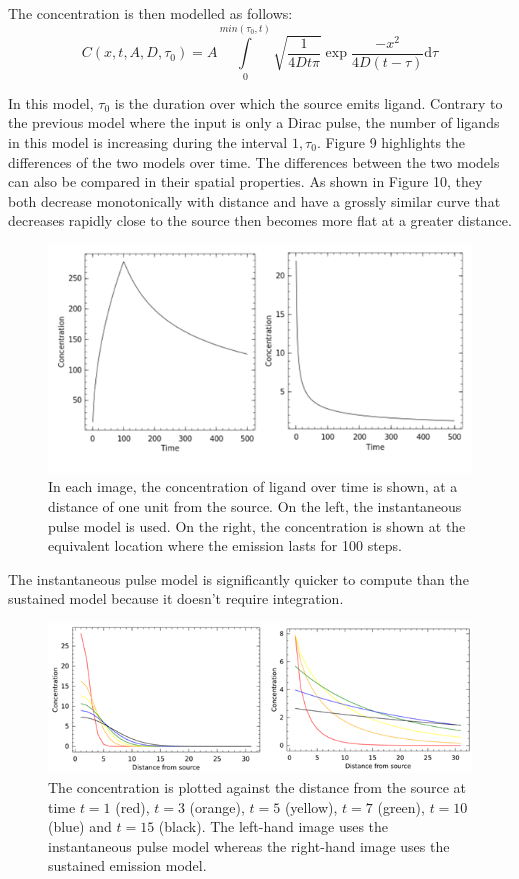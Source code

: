 \documentclass[12pt]{article}
\begin{document}
The concentration is then modelled as follows:
\begin{equation}
  C(x,t,A,D,\tau_0) = A\int\limits_0^{min(\tau_0,t)}\sqrt{\frac{1}{4Dt\pi}}\exp{\frac{-x^2}{4D(t-\tau)}}\mathrm{d}\tau
\end{equation}

In this model, \(\tau_0\) is the duration over which the 
source emits ligand. Contrary to the previous model where the input is 
only a Dirac pulse, the number of ligands in this model is increasing 
during the interval \(1,\tau_0\). Figure 9 
highlights the differences of the two models over time. The differences
between the two models can also be compared in their spatial properties. As
shown in Figure 10, they both decrease monotonically with distance and have
a grossly similar curve that decreases rapidly close to the source then
becomes more flat at a greater distance.

\begin{figure}[H]
\centering
\includegraphics[width=\textwidth]{media/sources.png}
\caption{In each image, the concentration of ligand over time is shown,
  at a distance of one unit from the source. On the left, the instantaneous
  pulse model is used. On the right, the concentration is shown at the
  equivalent location where the emission lasts for 100 steps.}
\end{figure}

The instantaneous pulse model is significantly quicker to compute than the
sustained model because it doesn't require integration.

\begin{figure}[H]
\centering
\includegraphics[width=\textwidth]{media/sources2.png}
\caption{The concentration is plotted against the distance from the source
  at time \(t=1\) (red), \(t=3\) 
  (orange), \(t=5\) (yellow), \(t=7\) (green), \(t=10\) (blue) and \(t=15\) (black).
  The left-hand image uses the instantaneous pulse model whereas the right-hand 
  image uses the sustained emission model.} 
\end{figure}
\end{document}
